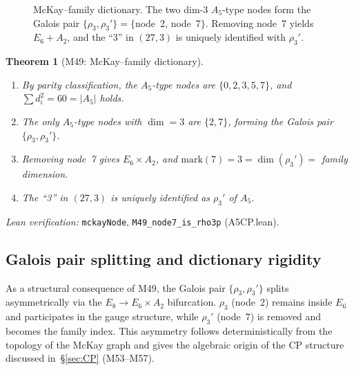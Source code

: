 \documentclass[sn-mathphys-num,Numbered]{sn-jnl}
\theoremstyle{thmstyleone}
\newtheorem{theorem}{Theorem}[section]
\theoremstyle{thmstylethree}
\begin{document}
\begin{figure}[t]
\caption{McKay--family dictionary. The two dim-3 $A_5$-type nodes form the Galois pair $\{\rho_3,\rho_3'\} = \{$node~2, node~7$\}$. Removing node~7 yields $E_6 + A_2$, and the ``3'' in $(27,3)$ is uniquely identified with $\rho_3'$.}
\label{fig:mckay_family_dictionary}
\end{figure}

\begin{theorem}[M49: McKay--family dictionary]\label{thm:M49}
\begin{enumerate}
  \item[\textup{(a)}] By parity classification, the $A_5$-type nodes are
    $\{0,2,3,5,7\}$, and $\sum d_i^2 = 60 = |A_5|$ holds.
  \item[\textup{(b)}] The only $A_5$-type nodes with $\dim = 3$ are
    $\{2,7\}$, forming the Galois pair $\{\rho_3, \rho_3'\}$.
  \item[\textup{(c)}] Removing node~7 gives $E_6 \times A_2$, and
    $\mathrm{mark}(7) = 3 = \dim(\rho_3') = $ family dimension.
  \item[\textup{(d)}] The ``3'' in $(27,3)$ is uniquely identified as
    $\rho_3'$ of $A_5$.
\end{enumerate}
\end{theorem}

\noindent\textit{Lean verification:}
\texttt{mckayNode}, \texttt{M49\_node7\_is\_rho3p} (A5CP.lean).


\subsection{Galois pair splitting and dictionary rigidity}\label{sec:galois-splitting}

As a structural consequence of M49, the Galois pair $\{\rho_3, \rho_3'\}$
splits asymmetrically via the $E_8 \to E_6 \times A_2$ bifurcation.  $\rho_3$
(node~2) remains inside $E_6$ and participates in the gauge structure, while
$\rho_3'$ (node~7) is removed and becomes the family index.  This asymmetry
follows deterministically from the topology of the McKay graph and gives the
algebraic origin of the CP structure discussed in~\S\ref{sec:CP}
(M53--M57).
\end{document}
